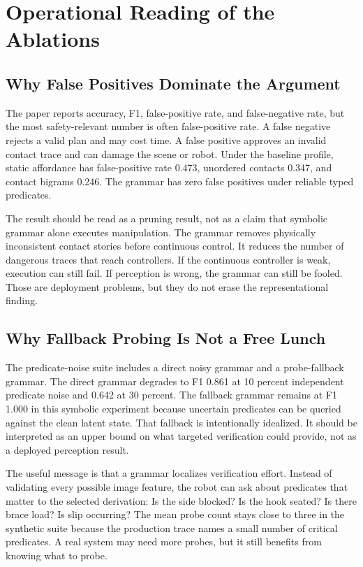 \documentclass{article}
\begin{document}
\section{Operational Reading of the Ablations}

\subsection{Why False Positives Dominate the Argument}

The paper reports accuracy, F1, false-positive rate, and false-negative rate, but the most safety-relevant number is often false-positive rate. A false negative rejects a valid plan and may cost time. A false positive approves an invalid contact trace and can damage the scene or robot. Under the baseline profile, static affordance has false-positive rate 0.473, unordered contacts 0.347, and contact bigrams 0.246. The grammar has zero false positives under reliable typed predicates.

The result should be read as a pruning result, not as a claim that symbolic grammar alone executes manipulation. The grammar removes physically inconsistent contact stories before continuous control. It reduces the number of dangerous traces that reach controllers. If the continuous controller is weak, execution can still fail. If perception is wrong, the grammar can still be fooled. Those are deployment problems, but they do not erase the representational finding.

\subsection{Why Fallback Probing Is Not a Free Lunch}

The predicate-noise suite includes a direct noisy grammar and a probe-fallback grammar. The direct grammar degrades to F1 0.861 at 10 percent independent predicate noise and 0.642 at 30 percent. The fallback grammar remains at F1 1.000 in this symbolic experiment because uncertain predicates can be queried against the clean latent state. That fallback is intentionally idealized. It should be interpreted as an upper bound on what targeted verification could provide, not as a deployed perception result.

The useful message is that a grammar localizes verification effort. Instead of validating every possible image feature, the robot can ask about predicates that matter to the selected derivation: Is the side blocked? Is the hook seated? Is there brace load? Is slip occurring? The mean probe count stays close to three in the synthetic suite because the production trace names a small number of critical predicates. A real system may need more probes, but it still benefits from knowing what to probe.
\end{document}
